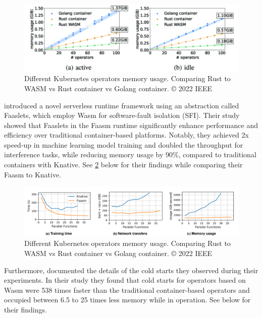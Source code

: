 \documentclass[
  table]{report}
\begin{document}
\begin{figure}[H]
\centering
  \includegraphics{assets/3.8-memoryusage-wasm.png}
  \caption{Different Kubernetes operators memory usage. Comparing Rust to WASM
vs Rust container vs Golang container. © 2022 IEEE}
  \label{fig:wasm-memory}
\end{figure}

\citet{shillakerFaasmLightweightIsolation2020a} introduced a novel
serverless runtime framework using an abstraction called Faaslets, which
employ \ac{Wasm} for software-fault isolation (SFI). Their study showed
that Faaslets in the Faasm runtime significantly enhance performance and
efficiency over traditional container-based platforms. Notably, they
achieved 2x speed-up in machine learning model training and doubled the
throughput for interference tasks, while reducing memory usage by 90\%,
compared to traditional containers with Knative. See
\cref{fig:wasm-faasm} below for their findings while comparing their
Faasm to Knative.

\begin{figure}[H]
\centering
  \includegraphics{assets/3.8-faasm.png}
  \caption{Different Kubernetes operators memory usage. Comparing Rust to WASM
vs Rust container vs Golang container. © 2022 IEEE}
  \label{fig:wasm-faasm}
\end{figure}

Furthermore, \citet{shillakerFaasmLightweightIsolation2020a} documented
the details of the cold starts they observed during their experiments.
In their study they found that cold starts for operators based on
\ac{Wasm} were 538 times faster than the traditional container-based
operators and occupied between 6.5 to 25 times less memory while in
operation. See  below for their findings.
\end{document}
